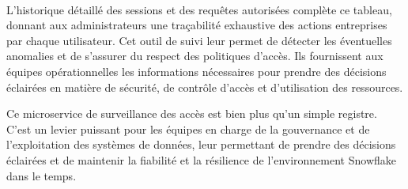 \begin{itemize}
                \\ L'historique détaillé des sessions et des requêtes autorisées complète ce tableau, donnant aux administrateurs une traçabilité exhaustive des actions entreprises par chaque utilisateur. Cet outil de suivi leur permet de détecter les éventuelles anomalies et de s'assurer du respect des politiques d'accès.
                Ils fournissent aux équipes opérationnelles les informations nécessaires pour prendre des décisions éclairées en matière de sécurité, de contrôle d'accès et d'utilisation des ressources.
\end{itemize}
\par Ce microservice de surveillance des accès est bien plus qu'un simple registre. C'est un levier puissant pour les équipes en charge de la gouvernance et de l'exploitation des systèmes de données, leur permettant de prendre des décisions éclairées et de maintenir la fiabilité et la résilience de l'environnement Snowflake dans le temps.
